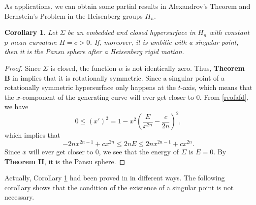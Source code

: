 \documentclass[12pt]{amsart}
\newtheorem{cor}[thm]{\sc Corollary}
\theoremstyle{definition}\newtheorem{exa}[thm]{\sc Example}
\theoremstyle{definition}\newtheorem{de}[thm]{\sc Definition}
\theoremstyle{definition}\newtheorem{rem}[thm]{\sc Remark}
\theoremstyle{definition}\newtheorem{prob}[thm]{\it Problem}
\theoremstyle{definition}\newtheorem{fact}[thm]{\sc Fact}
\theoremstyle{definition}\newtheorem{claim}[thm]{\sc Claim}
\numberwithin{equation}{section}
\begin{document}
As applications, we can obtain some partial results in Alexandrov's Theorem and Bernstein's Problem in the Heisenberg groups $H_{n}$.

\begin{cor}\label{co1}
Let $\Sigma$ be an embedded and closed hypersurface in $H_{n}$ with constant $p$-mean curvature $H=c>0$. If, moreover, it is umbilic with a singular point, then it is the Pansu sphere after a Heisenberg rigid motion. 
\end{cor}
\begin{proof} 
Since $\Sigma$ is closed, the function $\alpha$ is not identically zero. Thus, {\bf Theorem B} in \cite{CCHY2} implies that it is rotationally symmetric. Since a singular point of a rotationally symmetric hypersurface only happens at the $t$-axis, which means that the $x$-component of the generating curve will ever get closer to $0$. 
From \eqref{reofafd}, we have
\begin{equation*}
0\leq (x')^{2}=1-x^{2}\left(\frac{E}{x^{2n}}-\frac{c}{2n}\right)^{2}, 
\end{equation*}
which implies that 
\[-2nx^{2n-1}+cx^{2n}\leq 2nE\leq 2nx^{2n-1}+cx^{2n}.\]
Since $x$ will ever get closer to $0$, we see that the energy of $\Sigma$ is $E=0$. By {\bf Theorem II}, it is the Pansu sphere.
\end{proof}
Actually, Corollary \ref{co1} had been proved in \cite{CCHY1,CCHY2} in different ways. The following corollary shows that the condition of the existence of a singular point is not necessary. 
\end{document}
